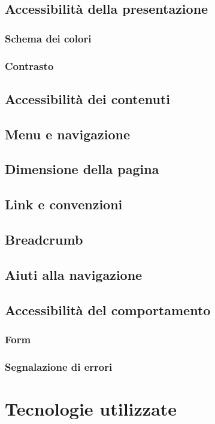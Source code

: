 \documentclass[12pt,a4paper]{article}
\begin{document}
\subsection{Accessibilità della presentazione}
\subsubsection{Schema dei colori}
\subsubsection{Contrasto}
\subsection{Accessibilità dei contenuti}
\subsection{Menu e navigazione}
\subsection{Dimensione della pagina}
\subsection{Link e convenzioni}
\subsection{Breadcrumb}
\subsection{Aiuti alla navigazione}
\subsection{Accessibilità del comportamento}
\subsubsection{Form}
\subsubsection{Segnalazione di errori}



\section{Tecnologie utilizzate}
\appendix
\end{document}
